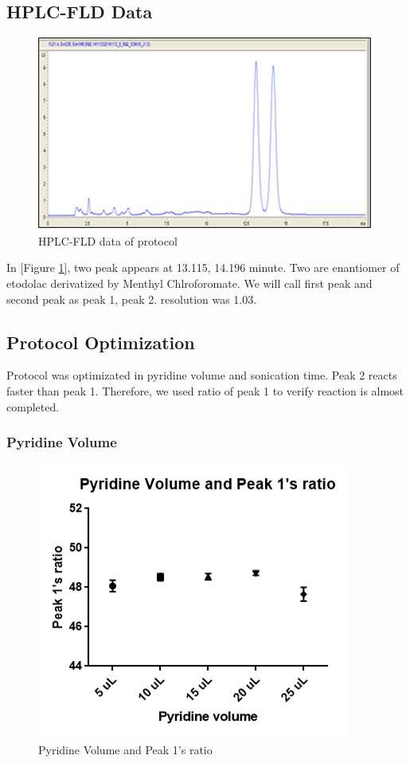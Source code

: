 \documentclass[12pt]{article} %
\begin{document}
\subsection {HPLC-FLD Data}
\begin{figure}[h!]
  \centering
  \includegraphics[width=\linewidth]{fig5.png}
  \caption{HPLC-FLD data of protocol}
  \label{fig:fig5}
\end{figure}

In [Figure \ref{fig:fig5}], two peak appears at 13.115, 14.196 minute. Two are enantiomer of etodolac derivatized by Menthyl Chlroforomate. We will call first peak and second peak as peak 1, peak 2. resolution was 1.03.

\subsection{ Protocol Optimization }

  Protocol was optimizated in pyridine volume and sonication time. Peak 2 reacts faster than peak 1. Therefore, we used ratio of peak 1 to verify reaction is almost completed.

\subsubsection {Pyridine Volume}


\begin{figure}[h!]
  \centering
  \includegraphics[width=0.6\linewidth]{fig6.png}
  \caption{Pyridine Volume and Peak 1's ratio}
  \label{fig:fig6}
\end{figure}
\end{document}
